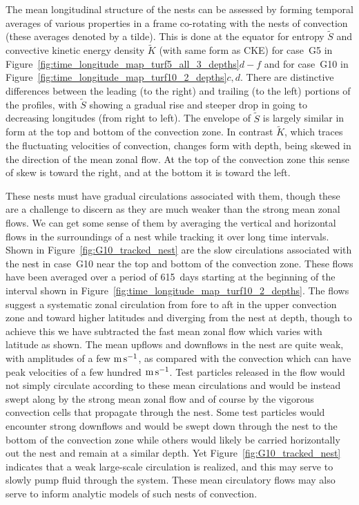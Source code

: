 The mean longitudinal structure of the nests can be assessed by
forming temporal averages of various properties in a frame co-rotating
with the nests of convection (these averages denoted by a tilde).
This is done at the equator for entropy $\widetilde{S}$ and 
convective kinetic energy density $\widetilde{K}$ (with same form as CKE) 
for case~G5 in Figure~\ref{fig:time_longitude_map_turf5_all_3_depths}$d-f$ and for 
case~G10 in Figure~\ref{fig:time_longitude_map_turf10_2_depths}$c,d$.
There are distinctive differences between the leading (to the right)
and trailing (to the left) portions of the profiles, with $\widetilde{S}$ showing
a gradual rise and steeper drop in going to decreasing longitudes
(from right to left).  The envelope of $\widetilde{S}$ is largely similar in form
at the top and bottom of the convection zone.  In contrast $\widetilde{K}$,
which traces the fluctuating velocities of convection, changes form
with depth, being skewed in the direction of the mean zonal flow.  At
the top of the convection zone this sense of skew is toward the
right, and at the bottom it is toward the left.

These nests must have gradual circulations associated with them, though these
are a challenge to discern as they are much weaker than the strong
mean zonal flows.  We can get some sense of them by averaging the
vertical and horizontal flows in the surroundings of a nest while
tracking it over long time intervals.  Shown in
Figure~\ref{fig:G10_tracked_nest} are the slow circulations associated
with the nest in case~G10 near the top and bottom of the convection zone.  
These flows have been averaged over a period of 615~days starting
at the beginning of the interval shown in
Figure~\ref{fig:time_longitude_map_turf10_2_depths}.  
The flows suggest a systematic zonal circulation from fore to aft in the upper
convection zone and toward higher latitudes and diverging from the nest
at depth, though to achieve this we have subtracted the fast mean
zonal flow which varies with latitude as shown.  
The mean upflows and downflows in the nest are quite weak, with amplitudes
of a few $\mathrm{m}\thinspace \mathrm{s}^{-1}$, as compared with the convection which can have
peak velocities of a few hundred $\mathrm{m}\thinspace \mathrm{s}^{-1}$.
Test particles released in the flow would not simply circulate
according to these mean circulations and would
be instead swept along by the strong mean zonal flow and of course by
the vigorous convection cells that propagate through the nest.  Some
test particles would encounter strong downflows and would be swept
down through the nest to the bottom of the convection zone while
others would likely be carried horizontally out the nest and remain at
a similar depth.
Yet Figure~\ref{fig:G10_tracked_nest} indicates that a weak large-scale
circulation is realized, and this may serve to slowly pump fluid
through the system.  These mean circulatory flows may also serve to inform
analytic models of such nests of convection.



